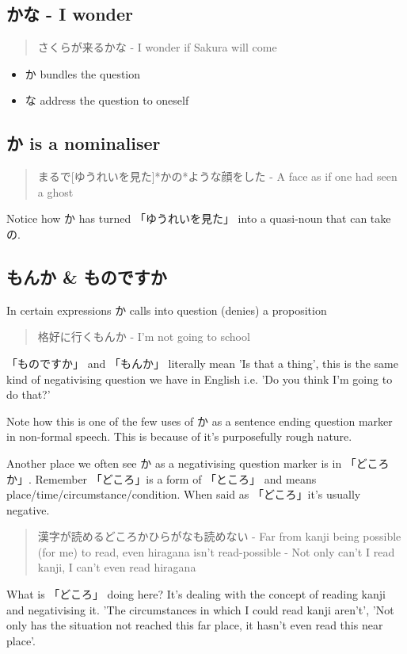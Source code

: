 \documentclass[11pt]{article}
\begin{document}
\subsection{かな - I wonder}
\label{sec:org5e10b6c}
\begin{quote}
さくらが来るかな - I wonder if Sakura will come
\end{quote}
\begin{itemize}
\item か bundles the question
\item な address the question to oneself
\end{itemize}


\subsection{か is a nominaliser}
\label{sec:org621c271}
\begin{quote}
まるで[ゆうれいを見た]*かの*ような顔をした - A face as if one had seen a ghost
\end{quote}
Notice how か has turned 「ゆうれいを見た」 into a quasi-noun that can take の.

\subsection{もんか \& ものですか}
\label{sec:orga311b70}
In certain expressions か calls into question (denies) a proposition
\begin{quote}
格好に行くもんか - I'm not going to school
\end{quote}

「ものですか」 and 「もんか」 literally mean 'Is that a thing', this is the same kind of negativising question we have in English i.e. 'Do you think I'm going to do that?'

Note how this is one of the few uses of か as a sentence ending question marker in non-formal speech. This is because of it's purposefully rough nature.

Another place we often see か as a negativising question marker is in 「どころか」. Remember 「どころ」is a form of 「ところ」 and means place/time/circumstance/condition. When said as 「どころ」it's usually negative.
\begin{quote}
漢字が読めるどころかひらがなも読めない - Far from kanji being possible (for me) to read, even hiragana isn't read-possible - Not only can't I read kanji, I can't even read hiragana
\end{quote}
What is 「どころ」 doing here? It's dealing with the concept of reading kanji and negativising it. 'The circumstances in which I could read kanji aren't', 'Not only has the situation not reached this far place, it hasn't even read this near place'.
\end{document}
